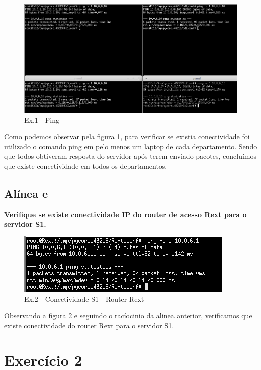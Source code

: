 \documentclass[a4paper]{report}
\begin{document}
\begin{figure}[H]
    \centering 
    \includegraphics[width=\textwidth]{images/pingEx1P2.png}
    \caption{Ex.1 - Ping}
    \label{fig:pingEx1P2}
\end{figure}
Como podemos observar pela figura \ref{fig:pingEx1P2}, para verificar se existia
conectividade foi utilizado o comando ping em pelo menos um laptop de cada
departamento. Sendo que todos obtiveram resposta do servidor após terem enviado
pacotes, concluímos que existe conectividade em todos os departamentos.

\subsection{Alínea e}
\textbf{Verifique se existe conectividade IP do router de acesso Rext para o
servidor S1.}\\

\begin{figure}[H]
    \centering 
    \includegraphics[width=\textwidth]{images/RextPing.png}
    \caption{Ex.2 - Conectividade S1 - Router Rext}
    \label{fig:RextPing}
\end{figure}
Observando a figura \ref{fig:RextPing} e seguindo o racíocinio da alinea
anterior, verificamos que existe conectividade do router Rext para o servidor
S1.

\section{Exercício 2}
\end{document}

